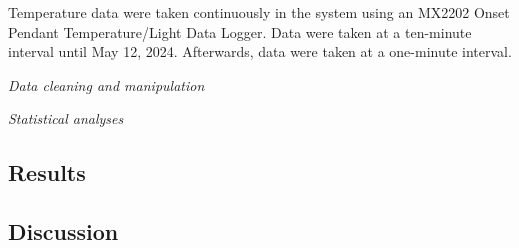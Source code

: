 \documentclass[
  letterpaper,
  DIV=11,
  numbers=noendperiod]{scrartcl}
\begin{document}
Temperature data were taken continuously in the system using an MX2202
Onset Pendant Temperature/Light Data Logger. Data were taken at a
ten-minute interval until May 12, 2024. Afterwards, data were taken at a
one-minute interval.

\emph{Data cleaning and manipulation}

\emph{Statistical analyses}

\subsection{Results}\label{results}

\subsection{Discussion}\label{discussion}
\end{document}
